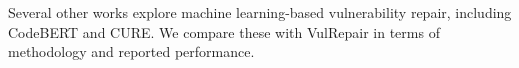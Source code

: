 Several other works explore machine learning-based vulnerability repair, including CodeBERT and CURE. We compare these with VulRepair in terms of methodology and reported performance.

